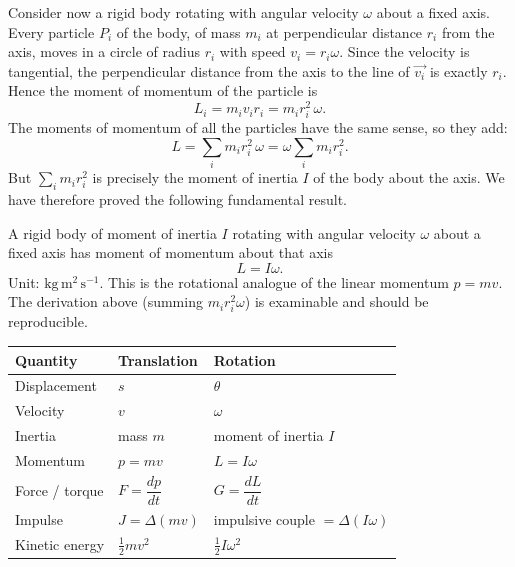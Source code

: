 \documentclass[11pt]{article}
\begin{document}
Consider now a rigid body rotating with angular velocity $\omega$ about a fixed axis. Every particle $P_i$ of the body, of mass $m_i$ at perpendicular distance $r_i$ from the axis, moves in a circle of radius $r_i$ with speed $v_i = r_i\omega$. Since the velocity is tangential, the perpendicular distance from the axis to the line of $\vec{v_i}$ is exactly $r_i$. Hence the moment of momentum of the particle is
\[
L_i = m_i v_i r_i = m_i r_i^{2}\,\omega .
\]
The moments of momentum of all the particles have the same sense, so they add:
\[
L = \sum_i m_i r_i^{2}\,\omega = \omega \sum_i m_i r_i^{2}.
\]
But $\sum_i m_i r_i^{2}$ is precisely the moment of inertia $I$ of the body about the axis. We have therefore proved the following fundamental result.

\begin{propriete}
A rigid body of moment of inertia $I$ rotating with angular velocity $\omega$ about a fixed axis has moment of momentum about that axis
\[
\boxed{L = I\omega}.
\]
Unit: $\mathrm{kg\,m^{2}\,s^{-1}}$. This is the rotational analogue of the linear momentum $p = mv$. The derivation above (summing $m_i r_i^2 \omega$) is examinable and should be reproducible.
\end{propriete}

\begin{aretenir}
\begin{center}
\begin{tabularx}{\linewidth}{|l|X|X|}
\hline
\rowcolor{popblueL} \textbf{Quantity} & \textbf{Translation} & \textbf{Rotation} \\
\hline
Displacement & $s$ & $\theta$ \\
\hline
Velocity & $v$ & $\omega$ \\
\hline
Inertia & mass $m$ & moment of inertia $I$ \\
\hline
Momentum & $p = mv$ & $L = I\omega$ \\
\hline
Force / torque & $F = \dfrac{dp}{dt}$ & $G = \dfrac{dL}{dt}$ \\
\hline
Impulse & $J = \Delta(mv)$ & impulsive couple $= \Delta(I\omega)$ \\
\hline
Kinetic energy & $\tfrac{1}{2}mv^{2}$ & $\tfrac{1}{2}I\omega^{2}$ \\
\hline
\end{tabularx}
\end{center}
\end{aretenir}
\end{document}
